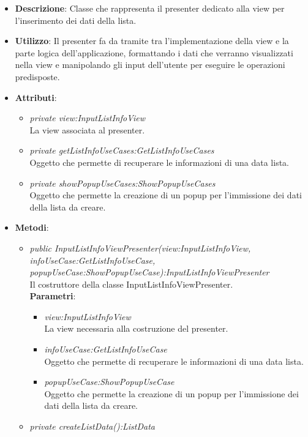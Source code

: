 \begin{itemize}
\item \textbf{Descrizione}: Classe che rappresenta il presenter dedicato alla view per l'inserimento dei dati della lista.
\item \textbf{Utilizzo}: Il presenter fa da tramite tra l'implementazione della view e la parte logica dell'applicazione, formattando i dati che verranno visualizzati nella view e manipolando gli input dell'utente per eseguire le operazioni predisposte.
\item \textbf{Attributi}: 	
	\begin{itemize}
	\item \textit{private view:InputListInfoView}\\
		La view associata al presenter.
	\item \textit{private getListInfoUseCases:GetListInfoUseCases}\\
		Oggetto che permette di recuperare le informazioni di una data lista.
	\item \textit{private showPopupUseCases:ShowPopupUseCases}\\
		Oggetto che permette la creazione di un popup per l'immissione dei dati della lista da creare.	
		\end{itemize}
\item \textbf{Metodi}:
	\begin{itemize}	
	\item \textit{public InputListInfoViewPresenter(view:InputListInfoView, infoUseCase:GetListInfoUseCase, \\ popupUseCase:ShowPopupUseCase):InputListInfoViewPresenter}\\
	Il costruttore della classe InputListInfoViewPresenter.
			\\ \textbf{Parametri}: \begin{itemize}
			\item \textit{view:InputListInfoView}\\
			La view necessaria alla costruzione del presenter.
			\item \textit{infoUseCase:GetListInfoUseCase}\\
			Oggetto che permette di recuperare le informazioni di una data lista.
			\item \textit{popupUseCase:ShowPopupUseCase}\\
			Oggetto che permette la creazione di un popup per l'immissione dei dati della lista da creare.	
			\end{itemize} 
	\item \textit{private createListData():ListData}\\

\end{itemize}
\end{itemize}
